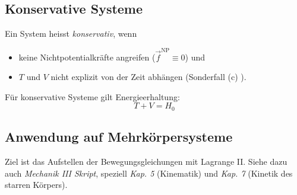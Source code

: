 	\subsection{Konservative Systeme} %
		\begin{definition}
			Ein System heisst \emph{konservativ}, wenn
			\begin{itemize}
				\item keine Nichtpotentialkräfte angreifen ($\vec f^\text{NP} \equiv 0$) und
				\item $T$ und $V$ nicht explizit von der Zeit abhängen (Sonderfall (c) ).
			\end{itemize}
			
			\begin{satz}
				Für konservative Systeme gilt Energieerhaltung:
				\[
					T + V = H_0
				\]
			\end{satz}
		\end{definition}
	
	\subsection{Anwendung auf Mehrkörpersysteme} %
		Ziel ist das Aufstellen der Bewegungsgleichungen mit Lagrange II. Siehe dazu auch \emph{Mechanik III Skript}, speziell \emph{Kap. 5} (Kinematik) und \emph{Kap. 7} (Kinetik des starren Körpers).
		
